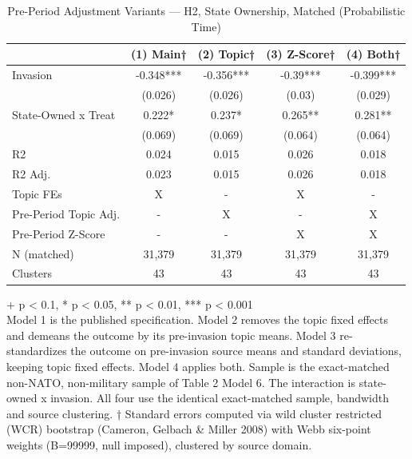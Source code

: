\begin{table}[t]
\caption{\label{tab:s15a}Pre-Period Adjustment Variants — H2, State Ownership, Matched (Probabilistic Time)}
\fontsize{12.0pt}{14.0pt}\selectfont
\begin{tabular*}{\linewidth}{@{\extracolsep{\fill}}lcccc}
\toprule
  & (1) Main† & (2) Topic† & (3) Z-Score† & (4) Both† \\ 
\midrule\addlinespace[2.5pt]
Invasion & -0.348*** & -0.356*** & -0.39*** & -0.399*** \\ 
 & (0.026) & (0.026) & (0.03) & (0.029) \\ 
State-Owned x Treat & 0.222* & 0.237* & 0.265** & 0.281** \\ 
{} & {(0.069)} & {(0.069)} & {(0.064)} & {(0.064)} \\ 
R2 & 0.024 & 0.015 & 0.026 & 0.018 \\ 
R2 Adj. & 0.023 & 0.015 & 0.026 & 0.018 \\ 
Topic FEs & X & - & X & - \\ 
Pre-Period Topic Adj. & - & X & - & X \\ 
Pre-Period Z-Score & - & - & X & X \\ 
N (matched) & 31,379 & 31,379 & 31,379 & 31,379 \\ 
Clusters & 43 & 43 & 43 & 43 \\ 
\bottomrule
\end{tabular*}
\begin{minipage}{\linewidth}
\vspace{.05em}
+ p < 0.1, * p < 0.05, ** p < 0.01, *** p < 0.001\\
Model 1 is the published specification. Model 2 removes the topic fixed effects
and demeans the outcome by its pre-invasion topic means. Model 3 re-standardizes
the outcome on pre-invasion source means and standard deviations, keeping topic
fixed effects. Model 4 applies both. Sample is the exact-matched non-NATO,
non-military sample of Table 2 Model 6. The interaction is state-owned x
invasion. All four use the identical exact-matched sample, bandwidth and
source clustering. † Standard errors computed via wild cluster restricted (WCR)
bootstrap (Cameron, Gelbach \& Miller 2008) with Webb six-point weights (B=99999,
null imposed), clustered by source domain.\\
\end{minipage}
\end{table}

